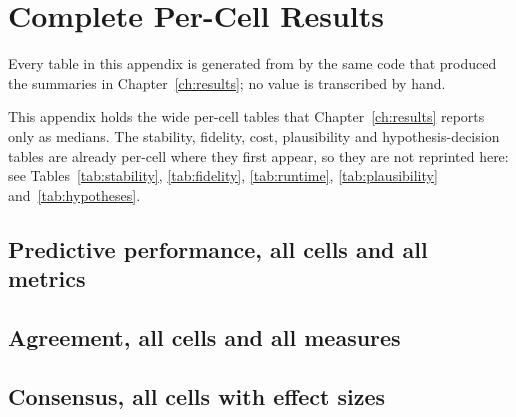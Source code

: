 \chapter{Complete Per-Cell Results}\label{app:fullresults}

Every table in this appendix is generated from  by the same code that
produced the summaries in Chapter~\ref{ch:results}; no value is transcribed by hand.

This appendix holds the wide per-cell tables that Chapter~\ref{ch:results} reports only as
medians. The stability, fidelity, cost, plausibility and hypothesis-decision tables are
already per-cell where they first appear, so they are not reprinted here: see
Tables~\ref{tab:stability}, \ref{tab:fidelity}, \ref{tab:runtime},
\ref{tab:plausibility} and~\ref{tab:hypotheses}.

\section{Predictive performance, all cells and all metrics}


\section{Agreement, all cells and all measures}


\section{Consensus, all cells with effect sizes}

